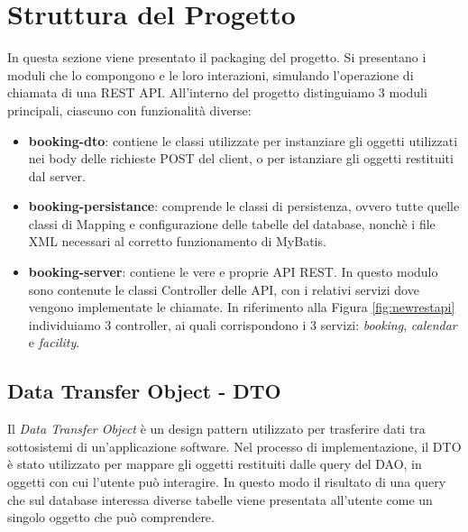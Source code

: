 \section{Struttura del Progetto}
In questa sezione viene presentato il packaging del progetto. Si presentano i moduli che lo compongono e le loro interazioni, simulando l'operazione di chiamata di una REST API. All'interno del progetto distinguiamo 3 moduli principali, ciascuno con funzionalità diverse:
\begin{itemize}
    \item \textbf{booking-dto}: contiene le classi utilizzate per instanziare gli oggetti utilizzati nei body delle richieste POST del client, o per istanziare gli oggetti restituiti dal server.
    \item \textbf{booking-persistance}: comprende le classi di persistenza, ovvero tutte quelle classi di Mapping e configurazione delle tabelle del database, nonchè i file XML necessari al corretto funzionamento di MyBatis.
    \item \textbf{booking-server}: contiene le vere e proprie API REST. In questo modulo sono contenute le classi Controller delle API, con i relativi servizi dove vengono implementate le chiamate. In riferimento alla Figura \ref{fig:newrestapi} individuiamo 3 controller, ai quali corrispondono i 3 servizi: \emph{booking}, \emph{calendar} e \emph{facility}.
\end{itemize}

\subsection{Data Transfer Object - DTO}
Il \emph{Data Transfer Object} è un design pattern utilizzato per trasferire dati tra sottosistemi di un'applicazione software. Nel processo di implementazione, il DTO è stato utilizzato per mappare gli oggetti restituiti dalle query del DAO, in oggetti con cui l'utente può interagire. In questo modo il risultato di una query che sul database interessa diverse tabelle viene presentata all'utente come un singolo oggetto che può comprendere.

